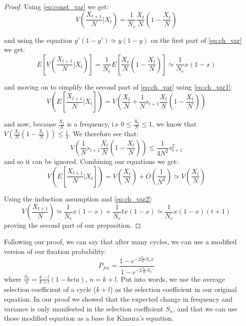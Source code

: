 \documentclass[12pt]{extarticle}
\begin{document}
\begin{proof}
Using \cref{eq:const_var} we get:
\begin{equation}
V\left(\frac{X_{t+1}}{N} \bigg|X_t \right) = \frac{1}{N_e}\frac{X_t}{N}\left(1-\frac{X_t}{N} \right)
\end{equation}

and using the equation $y'(1-y') \simeq y(1-y)$ on the first part of \cref{eq:ch_var} we get:
\begin{equation}\label{eq:ch_var2}
E\left[V\left(\frac{X_{t+1}}{N} \bigg|X_t \right)\right] = \frac{1}{N_e}E\left[\frac{X_t}{N}\left(1- \frac{X_t}{N}\right) \right] \simeq \frac{1}{N_e} x(1-x)
\end{equation}

and moving on to simplify the second part of \cref{eq:ch_var} using \cref{eq:ch_var1}:
\begin{equation}
V\left(E\left[\frac{X_{t+1}}{N} \bigg|X_t \right]\right) = V\left(\frac{X_t}{N} + \frac{1}{N}s_{t+1}\frac{X_t}{N}\left(1-\frac{X_t}{N} \right) \right)
\end{equation}

and now, because $\frac{X_t}{N}$ is a frequency, i.e $0\leq\frac{X_t}{N}\leq1$, we know that $V\left(\frac{X_t}{N}\left(1-\frac{X_t}{N} \right) \right)\leq\frac{1}{4}$. We therefore see that:
\begin{equation}
V\left(\frac{1}{N}s_{t+1}\frac{X_t}{N}\left(1-\frac{X_t}{N} \right) \right)\leq \frac{1}{4N^2}s^2_{t+1}
\end{equation}
and so it can be ignored.
Combining our equations we get:
\begin{equation}
V\left(E\left[\frac{X_{t+1}}{N} \bigg|X_t \right]\right) = V\left(\frac{X_t}{N}\right) + O\left(\frac{1}{N^2}\right)\simeq V\left(\frac{X_t}{N}\right)
\end{equation}

Using the induction assumption and \cref{eq:ch_var2}:
\begin{equation}
V\left(\frac{X_{t+1}}{N}\right) \simeq \frac{1}{N_e}x(1-x) + \frac{1}{N_e}tx(1-x) \simeq \frac{1}{N_e}x(1-x)(t+1)
\end{equation}
proving the second part of our preposition.
\end{proof}

Following our proof, we can say that after many cycles, we can use a modified version of our fixation probability:
\begin{equation}
P_{fix} = \frac{1-e^{-2 \frac{S_n}{n} N_e x}}{1-e^{-2 \frac{S_n}{n} N_e}}
\end{equation}
where $\frac{S_n}{n} = \frac{k-l}{k+l}(1-beta)$, $n=k+l$. Put into words, we use the average selection coefficient of a cycle ($k+l$) as the selection coefficient in our original equation.
In our proof we showed that the expected change in frequency and variance is only manifested in the selection coefficient $S_n$, and that we can use those modified equation as a base for Kimura's equation.
\end{document}
